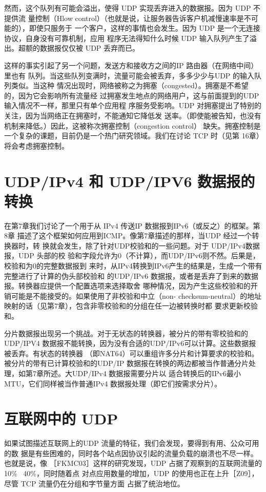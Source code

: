 然而，这个队列有可能会溢出，使得 UDP 实现丢弃进入的数据报。因为 UDP 不提供流
量控制（Hlow control）（也就是说，让服务器告诉客户机减慢速率是不可能的），即使只服务于
一个客户，这样的事情也会发生。因为 UDP 是一个无连接协议，自身没有可靠机制，应用
程序无法得知什么时候 UDP 输入队列产生了溢出。超额的数据报仅仅被 UDP 丢弃而已。

这样的事实引起了另一个问题，发送方和接收方之间的IP 路由器（在网络中间）里也有
队列。当这些队列变满时，流量可能会被丢弃，多多少少与UDP 的输入队列类似。当这种
情况出现时，网络被称之为拥塞（congested）。拥塞是不希望的，因为它会影响所有流量经
过拥塞发生地点的网络用户，这与前面提到的UDP 输入情况不一样，那里只有单个应用程
序服务受影响。UDP 对拥塞提出了特别的关注，因为当网络正在拥塞时，不能通知它降低发
送率。（即使能被告知，也没有机制来降低。）因此，这被称次拥塞控制（congestion control）
缺失。拥塞控制是一个复杂的课题，目前仍是一个热门研究领域。我们在讨论 TCP 时（见第
16章）将会考虑拥塞控制。

\section{UDP/IPv4 和 UDP/IPV6 数据报的转换}
在第7章我们讨论了一个用于从 IPv4 传送IP 数据报到IPv6（或反之）的框架。第8章
描述了这个框架如何应用到ICMP。像第7章描述的那样，当UDP 经过一个转换器时，转
换就会发生，除了针对UDP校验和的一些问题。对于 UDP/IPv4数据报，UDP 头部的校
验和字段允许为0（不计算），而UDP/IPv6则不然。后果是，校验和为0的完整数据报到
来时，从IPv4转换到IPv6产生的结果是，生成一个带有完整进行了计算的伪头部校验和
的UDP/IPv6 数据报，或者是丢弃了到来的数据报。转换器应提供一个配置选项来选择取舍
哪种情况，因为产生这些校验和的开销可能是不能接受的。如果使用了非校验和中立（non-
checksum-neutral）的地址映射的话（见第7章），包含非零校验和的分组在任一边被转换时都
要求更新校验和。

分片数据报出现另一个挑战。对于无状态的转换器，被分片的带有零校验和的 UDP/IPV4
数据报不能转换，因为没有合适的UDP/IPv6可以计算。这些数据报被丢弃。有状态的转换器
（即NAT64）可以重组许多分片和计算要求的校验和。被分片的带有已计算校验和的UDP/IP
数据报在转换的两边都被当作普通分片处理，如第7章所述。大UDP/IPv4 数据报需要分片以
适合转换后的IPv6最小MTU，它们同样被当作普通IPv4 数据报处理（即它们按需求分片）。

\section{互联网中的 UDP}
如果试图描述互联网上的UDP 流量的特征，我们会发现，要得到有用、公众可用的数
据是有些困难的，同时各个站点因协议引起的流量负载的崩溃也不尽一样。也就是说，像
［FKMC03］这样的研究发现，UDP 占据了观察到的互联网流量的10\% ~40\%，同时随着点
对点应用数量的增加，UDP 的使用也正在上升［Z09］，尽管 TCP 流量仍在分组和字节量方面
占据了统治地位。

